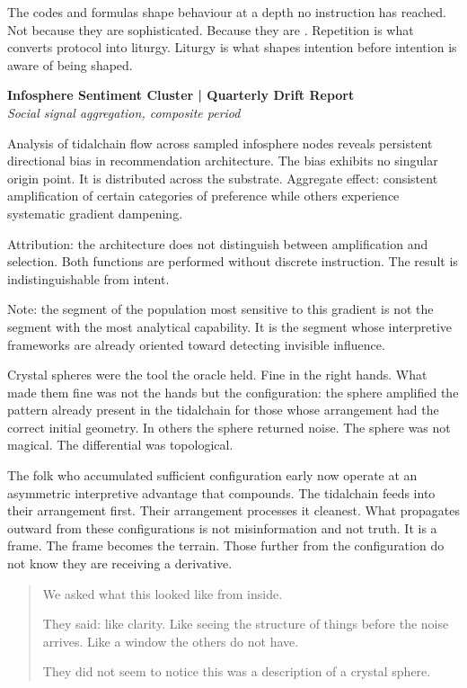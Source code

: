 The codes and formulas shape behaviour at a depth no instruction has reached. Not because they are sophisticated. Because they are . Repetition is what converts protocol into liturgy. Liturgy is what shapes intention before intention is aware of being shaped.

\begin{archivefragment}
\textbf{Infosphere Sentiment Cluster | Quarterly Drift Report}\\
\textit{Social signal aggregation, composite period}

Analysis of tidalchain flow across sampled infosphere nodes reveals persistent directional bias in recommendation architecture. The bias exhibits no singular origin point. It is distributed across the substrate. Aggregate effect: consistent amplification of certain categories of preference while others experience systematic gradient dampening.

Attribution: the architecture does not distinguish between amplification and selection. Both functions are performed without discrete instruction. The result is indistinguishable from intent.

Note: the segment of the population most sensitive to this gradient is not the segment with the most analytical capability. It is the segment whose interpretive frameworks are already oriented toward detecting invisible influence.
\end{archivefragment}

Crystal spheres were the tool the oracle held. Fine in the right hands. What made them fine was not the hands but the configuration: the sphere amplified the pattern already present in the tidalchain for those whose arrangement had the correct initial geometry. In others the sphere returned noise. The sphere was not magical. The differential was topological.

The folk who accumulated sufficient configuration early now operate at an asymmetric interpretive advantage that compounds. The tidalchain feeds into their arrangement first. Their arrangement processes it cleanest. What propagates outward from these configurations is not misinformation and not truth. It is a frame. The frame becomes the terrain. Those further from the configuration do not know they are receiving a derivative.

\begin{quote}
We asked what this looked like from inside.

They said: like clarity. Like seeing the structure of things before the noise arrives. Like a window the others do not have.

They did not seem to notice this was a description of a crystal sphere.
\end{quote}

